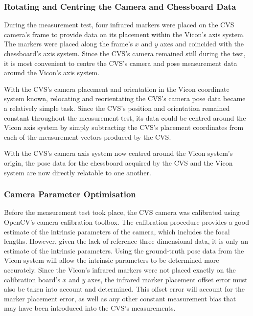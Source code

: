 \subsubsection{Rotating and Centring the Camera and Chessboard Data}
\label{sec:rotate-axes}

During the measurement test, four infrared markers were placed on the CVS camera's frame to provide data on its placement within the Vicon's axis system. The markers were placed along the frame's $x$ and $y$ axes and coincided with the chessboard's axis system. Since the CVS's camera remained still during the test, it is most convenient to centre the CVS's camera and pose measurement data around the Vicon's axis system. 

With the CVS's camera placement and orientation in the Vicon coordinate system known, relocating and reorientating the CVS's camera pose data became a relatively simple task. Since the CVS's position and orientation remained constant throughout the measurement test, its data could be centred around the Vicon axis system by simply subtracting the CVS's placement coordinates from each of the measurement vectors produced by the CVS.

With the CVS's camera axis system now centred around the Vicon system's origin, the pose data for the chessboard acquired by the CVS and the Vicon system are now directly relatable to one another.  

\subsubsection{Camera Parameter Optimisation}
\label{sec:focal-optimisation}

Before the measurement test took place, the CVS camera was calibrated using OpenCV's camera calibration toolbox. The calibration procedure provides a good estimate of the intrinsic parameters of the camera, which includes the focal lengths. However, given the lack of reference three-dimensional data, it is only an estimate of the intrinsic parameters. Using the ground-truth pose data from the Vicon system will allow the intrinsic parameters to be determined more accurately. Since the Vicon's infrared markers were not placed exactly on the calibration board's $x$ and $y$ axes, the infrared marker placement offset error must also be taken into account and determined. This offset error will account for the marker placement error, as well as any other constant measurement bias that may have been introduced into the CVS's measurements. 

